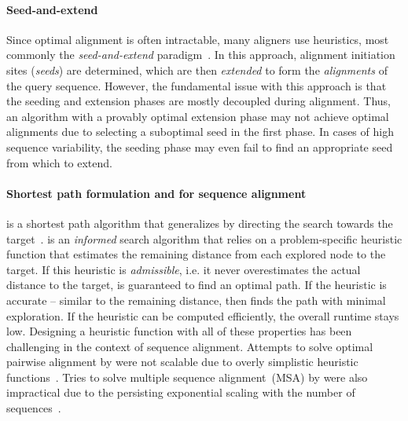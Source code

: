\paragraph{Seed-and-extend}
Since optimal alignment is often intractable, many aligners use heuristics, most
commonly the \emph{seed-and-extend}
paradigm~\cite{altschul_basic_1990,langmead_fast_2012,li_fast_2009}. In this
approach, alignment initiation sites (\emph{seeds}) are determined, which are
then \emph{extended} to form the \emph{alignments} of the query sequence.
However, the fundamental issue with this approach is that the seeding and
extension phases are mostly decoupled during alignment. Thus, an algorithm with
a provably optimal extension phase may not achieve optimal alignments due to
selecting a suboptimal seed in the first phase. In cases of high sequence
variability, the seeding phase may even fail to find an appropriate seed from
which to extend.

\paragraph{Shortest path formulation and \A for sequence alignment}
\A is a shortest path algorithm that generalizes \dijkstra by directing the
search towards the target~\citep{hart1968formal}. \A is an \emph{informed}
search algorithm that relies on a problem-specific heuristic function that
estimates the remaining distance from each explored node to the target. If this
heuristic is \emph{admissible}, i.e. it never overestimates the actual distance
to the target, \A is guaranteed to find an optimal path. If the heuristic is
accurate -- similar to the remaining distance, then \A finds the path
with minimal exploration. If the heuristic can be computed efficiently, the
overall runtime stays low. Designing a heuristic function with all of these
properties has been challenging in the context of sequence alignment. Attempts
to solve optimal pairwise alignment by \A were not scalable due to overly
simplistic heuristic functions~\cite{dox2018efficient}. Tries to solve multiple
sequence alignment~(MSA) by \A were also impractical due to the persisting
exponential scaling with the number of
sequences~\citep{lermen2000practical,zhou2002multiple,mcnaughton2002memory}.

